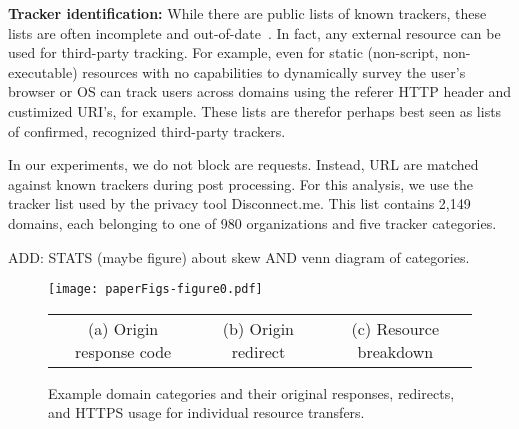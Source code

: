 \documentclass{sig-alternate-10pt}
\begin{document}
{\bf Tracker identification:}
While there are public lists of known trackers, 
these lists are often incomplete and out-of-date~\cite{ref35, ref22}.
In fact,  any external resource can be used for third-party tracking.
For example, even for static (non-script, non-executable) resources with no capabilities to
dynamically survey the user’s browser or OS can track users across domains using
the referer  HTTP header and custimized URI's, for example.
These lists are therefor perhaps best seen as lists of confirmed, recognized third-party trackers.

In our experiments, we do not block are requests.  Instead, URL are matched against known 
trackers during post processing.  For this analysis, we use the tracker list
used by the privacy tool Disconnect.me.  This list contains 2,149 domains,
each belonging to one of 980 organizations and five tracker categories.

ADD: STATS (maybe figure) about skew AND venn diagram of categories.


\begin{figure*}[t]
\centering
\texttt{[image: paperFigs-figure0.pdf]}
\begin{tabular}{ccc}
(a) Origin response code &
(b) Origin redirect &
(c) Resource breakdown \\
\end{tabular}
\caption{Example domain categories and their original responses, 
redirects, and HTTPS usage for individual resource transfers.}
\label{fig:httpsDiff}
\vspace{-0pt}
\end{figure*}
\end{document}
